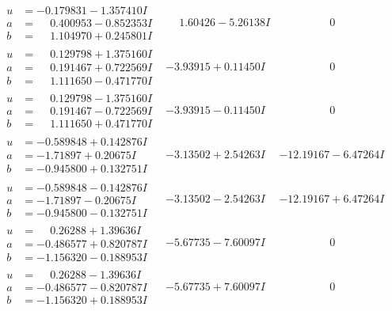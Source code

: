 \documentclass[1p]{elsarticle_modified}
\theoremstyle{definition}
\begin{document}
$$\begin{array}{c|c|c}
\begin{aligned}
u &= -0.179831 - 1.357410 I \\
a &= \phantom{-}0.400953 - 0.852353 I \\
b &= \phantom{-}1.104970 + 0.245801 I\end{aligned}
 & \phantom{-}1.60426 - 5.26138 I & \phantom{-0.000000 } 0 \\ \hline\begin{aligned}
u &= \phantom{-}0.129798 + 1.375160 I \\
a &= \phantom{-}0.191467 + 0.722569 I \\
b &= \phantom{-}1.111650 - 0.471770 I\end{aligned}
 & -3.93915 + 0.11450 I & \phantom{-0.000000 } 0 \\ \hline\begin{aligned}
u &= \phantom{-}0.129798 - 1.375160 I \\
a &= \phantom{-}0.191467 - 0.722569 I \\
b &= \phantom{-}1.111650 + 0.471770 I\end{aligned}
 & -3.93915 - 0.11450 I & \phantom{-0.000000 } 0 \\ \hline\begin{aligned}
u &= -0.589848 + 0.142876 I \\
a &= -1.71897 + 0.20675 I \\
b &= -0.945800 + 0.132751 I\end{aligned}
 & -3.13502 + 2.54263 I & -12.19167 - 6.47264 I \\ \hline\begin{aligned}
u &= -0.589848 - 0.142876 I \\
a &= -1.71897 - 0.20675 I \\
b &= -0.945800 - 0.132751 I\end{aligned}
 & -3.13502 - 2.54263 I & -12.19167 + 6.47264 I \\ \hline\begin{aligned}
u &= \phantom{-}0.26288 + 1.39636 I \\
a &= -0.486577 + 0.820787 I \\
b &= -1.156320 - 0.188953 I\end{aligned}
 & -5.67735 - 7.60097 I & \phantom{-0.000000 } 0 \\ \hline\begin{aligned}
u &= \phantom{-}0.26288 - 1.39636 I \\
a &= -0.486577 - 0.820787 I \\
b &= -1.156320 + 0.188953 I\end{aligned}
 & -5.67735 + 7.60097 I & \phantom{-0.000000 } 0 \\ \hline\begin{aligned}

\end{aligned}
\end{array}$$
\end{document}
